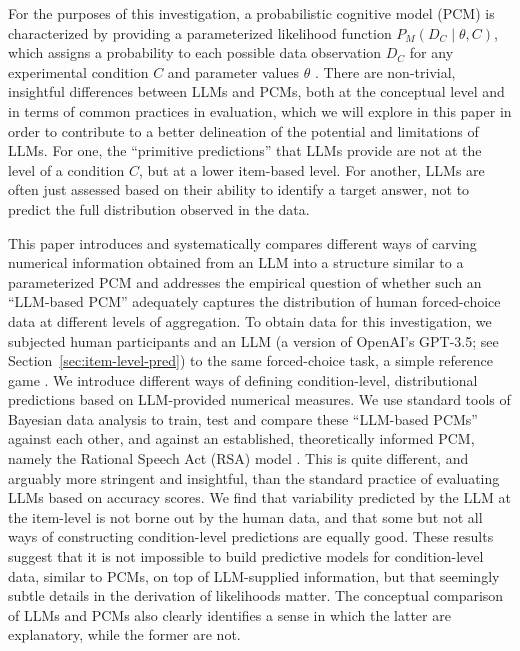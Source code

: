 \documentclass[fleqn]{article}
\begin{document}
For the purposes of this investigation, a probabilistic cognitive model (PCM) is characterized by providing a parameterized likelihood function $P_{M}(D_{C} \mid \theta, C)$, which assigns a probability to each possible data observation $D_{C}$ for any experimental condition $C$ and parameter values $\theta$ \citep[e.g.,][]{LewandowskyFarrell2011:Computational-M,LeeWagenmakers2013:Bayesian-Cognit}.
There are non-trivial, insightful differences between LLMs and PCMs, both at the conceptual level and in terms of common practices in evaluation, which we will explore in this paper in order to contribute to a better delineation of the potential and limitations of LLMs.
For one, the ``primitive predictions'' that LLMs provide are not at the level of a condition $C$, but at a lower item-based level.
For another, LLMs are often just assessed based on their ability to identify a target answer, not to predict the full distribution observed in the data.

This paper introduces and systematically compares different ways of carving numerical information obtained from an LLM into a structure similar to a parameterized PCM and addresses the empirical question of whether such an ``LLM-based PCM'' adequately captures the distribution of human forced-choice data at different levels of aggregation.
To obtain data for this investigation, we subjected human participants and an LLM (a version of OpenAI's GPT-3.5; see Section~\ref{sec:item-level-pred}) to the same forced-choice task, a simple reference game \citep{FrankGoodman2012:Predicting-Prag}.
We introduce different ways of defining condition-level, distributional predictions based on LLM-provided numerical measures.
We use standard tools of Bayesian data analysis \citep{GelmanCarlin2014:Bayesian-Data-A} to train, test and compare these ``LLM-based PCMs'' against each other, and against an established, theoretically informed PCM, namely the Rational Speech Act (RSA) model \citep{FrankGoodman2012:Predicting-Prag}.
This is quite different, and arguably more stringent and insightful, than the standard practice of evaluating LLMs based on accuracy scores.
We find that variability predicted by the LLM at the item-level is not borne out by the human data, and that some but not all ways of constructing condition-level predictions are equally good.
These results suggest that it is not impossible to build predictive models for condition-level data, similar to PCMs, on top of LLM-supplied information, but that seemingly subtle details in the derivation of likelihoods matter.
The conceptual comparison of LLMs and PCMs also clearly identifies a sense in which the latter are explanatory, while the former are not.
\end{document}
